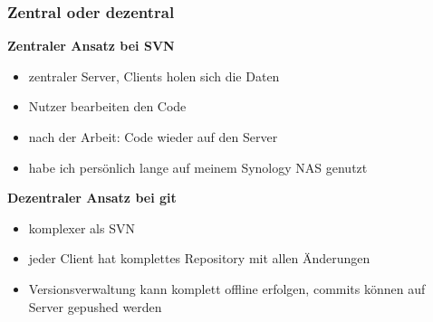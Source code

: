 \documentclass[12pt,ngerman]{beamer}
\begin{document}
\begin{frame}
\frametitle{Zentral oder dezentral}

{\bfseries Zentraler Ansatz bei SVN}

\begin{itemize}
	\item zentraler Server, Clients holen sich die Daten
	\item Nutzer bearbeiten den Code
	\item nach der Arbeit: Code wieder auf den Server
	\item habe ich persönlich lange auf meinem Synology NAS genutzt
\end{itemize}

{\bfseries Dezentraler Ansatz bei git}

\begin{itemize}
	\item komplexer als SVN
	\item jeder Client hat komplettes Repository mit allen Änderungen
	\item Versionsverwaltung kann komplett offline erfolgen, commits können auf Server gepushed werden
\end{itemize}



\end{frame}
\end{document}
